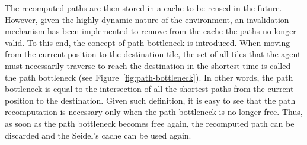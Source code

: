 The recomputed paths are then stored in a cache to be reused in the future. However, given the highly dynamic nature of the environment, an invalidation mechanism has been implemented to remove from the cache the paths no longer valid. To this end, the concept of path bottleneck is introduced. When moving from the current position to the destination tile, the set of all tiles that the agent must necessarily traverse to reach the destination in the shortest time is called the path bottleneck (see Figure~\ref{fig:path-bottleneck}). In other words, the path bottleneck is equal to the intersection of all the shortest paths from the current position to the destination. Given such definition, it is easy to see that the path recomputation is necessary only when the path bottleneck is no longer free. Thus, as soon as the path bottleneck becomes free again, the recomputed path can be discarded and the Seidel's cache can be used again.
